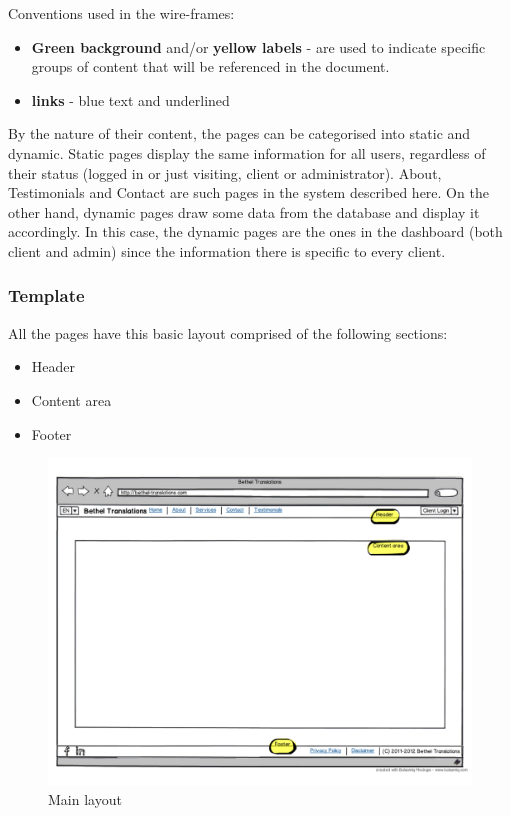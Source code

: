 \documentclass{l3proj}
\begin{document}
Conventions used in the wire-frames:
\begin{itemize} \itemsep1pt \parskip0pt 
	\item \textbf{Green background} and/or \textbf{yellow labels} - are used to
	indicate specific groups of content that will be referenced in the document.
	\item \textbf{links} - blue text and underlined
\end{itemize}

By the nature of their content, the pages can be categorised into static and
dynamic. Static pages display the same information for all users, regardless of
their status (logged in or just visiting, client or administrator). About,
Testimonials and Contact are such pages in the system described here. On the
other hand, dynamic pages draw some data from the database and display it
accordingly. In this case, the dynamic pages are the ones in the dashboard
(both client and admin) since the information there is specific to
every client.


\subsubsection*{Template}
All the pages have this basic layout comprised of the following sections:
\begin{itemize} \itemsep1pt \parskip0pt 
	\item Header
	\item Content area
	\item Footer
\end{itemize}

\begin{figure}
\centering
\includegraphics[width=\linewidth, trim = 0px 50px 0px 50px]
	{wireframes/main-layout}
\caption{Main layout}
\label{wireframes-main-layout}
\end{figure}
\end{document}
